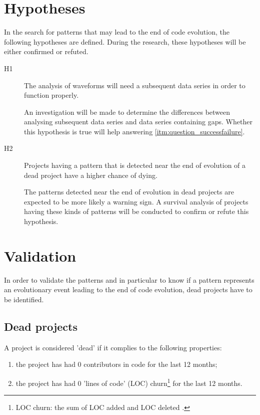 \section{Hypotheses}
In the search for patterns that may lead to the end of code evolution, the
following hypotheses are defined. During the research, these hypotheses will be
either confirmed or refuted.

\begin{description}
	\item[H1\label{hyp:subsequent_data}] \hspace{0em}
	The analysis of waveforms will need a subsequent data series in order
	to function properly.

\begin{comment}
Further evaluation of the data should be done prior to the selection of the
data set for the study. It is expected that not all data is suitable for
analysis.
\end{comment}

	An investigation will be made to determine the differences between analysing
	subsequent data series and data series containing gaps. Whether this
	hypothesis is true will help answering \ref{itm:question_successfailure}.
	
	\item[H2\label{hyp:pattern_types}] \hspace{0em}
	Projects having a pattern that is detected near the end of evolution of a
	dead project have a higher chance of dying.

	The patterns detected near the end of evolution in dead projects are
	expected to be more likely a warning sign. A survival analysis of projects
	having these kinds of patterns will be conducted to confirm or refute this
	hypothesis.
\end{description}

\section{Validation}
\label{method:validation}
In order to validate the patterns and in particular to know if a pattern
represents an evolutionary event leading to the end of code evolution, dead
projects have to be identified.

\subsection{Dead projects}
\label{def:dead}
A project is considered 'dead' if it complies to the following properties:
\begin{enumerate}
	\item the project has had 0 contributors in code for the last 12 months;
	\item the project has had 0 'lines of code' (LOC) churn\footnote{LOC churn:
	the sum of LOC added and LOC deleted \cite{elbaum}.} for the last 12 months.
\end{enumerate}

